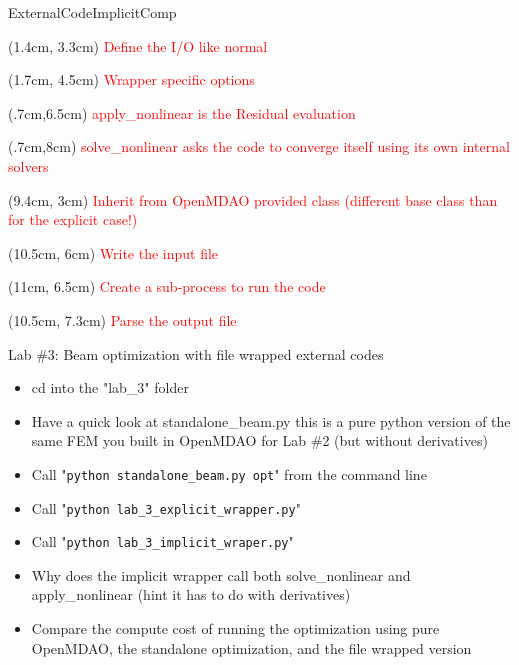 \documentclass[aspectratio=169, usenames,dvipsnames, 14pt]{beamer}
\begin{document}
\begin{frame}{ExternalCodeImplicitComp}
	\begin{textblock*}{6cm}(1.4cm, 3.3cm)
		\scriptsize \textcolor{red}{Define the I/O like normal}
	\end{textblock*}
	\begin{textblock*}{6cm}(1.7cm, 4.5cm)
		\scriptsize \textcolor{red}{Wrapper specific options}
	\end{textblock*}
	\begin{textblock*}{6cm}(.7cm,6.5cm)
		\scriptsize \textcolor{red}{apply\_nonlinear is the Residual \newline evaluation}
	\end{textblock*}
	\begin{textblock*}{6cm}(.7cm,8cm)
		\scriptsize \textcolor{red}{solve\_nonlinear asks the code to \newline converge itself using its own \newline internal solvers}
	\end{textblock*}
	\begin{textblock*}{6cm}(9.4cm, 3cm)
		\scriptsize \textcolor{red}{Inherit from OpenMDAO provided class (different base class than for the explicit case!)}
	\end{textblock*}
	\begin{textblock*}{6cm}(10.5cm, 6cm)
		\scriptsize \textcolor{red}{Write the input file}
	\end{textblock*}
	\begin{textblock*}{6cm}(11cm, 6.5cm)
		\scriptsize \textcolor{red}{Create a sub-process to run the code}
	\end{textblock*}
	\begin{textblock*}{6cm}(10.5cm, 7.3cm)
		\scriptsize \textcolor{red}{Parse the output file}
	\end{textblock*}
\end{frame}

\begin{frame}{Lab \#3: Beam optimization with file wrapped external codes}
	\begin{itemize}
		\item \small cd into the "lab\_3" folder
		\item \small Have a quick look at standalone\_beam.py \newline this is a pure python version of the same FEM you built in 					OpenMDAO for Lab \#2 (but without derivatives)
		\item \small Call "\texttt{python standalone\_beam.py opt}" from the command line
		\item \small Call "\texttt{python lab\_3\_explicit\_wrapper.py}"
		\item \small Call "\texttt{python lab\_3\_implicit\_wraper.py}"
		\item \small Why does the implicit wrapper call both solve\_nonlinear and apply\_nonlinear (hint\: it has to do with derivatives)
		\item \small Compare the compute cost of running the optimization using pure OpenMDAO, the standalone optimization, and the 				file wrapped version
	\end{itemize}
\end{frame}
\end{document}
